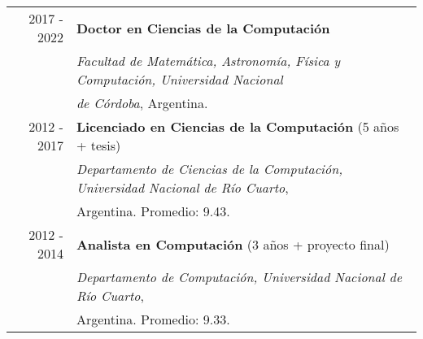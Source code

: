 \documentclass[a4paper,10pt]{article} %
\begin{document}
\begin{tabular}{rl}
\\
\textsc{2017 - 2022}	& \textbf{Doctor en Ciencias de la Computación} \\
& \textit{Facultad de Matemática, Astronomía, Física y Computación, Universidad Nacional} \\ 
& \textit{de Córdoba}, Argentina. \\

\textsc{2012 - 2017}	& \textbf{Licenciado en Ciencias de la Computación} (5 años + tesis) \\
& \textit{Departamento de Ciencias de la Computación, Universidad Nacional de Río Cuarto}, \\
& Argentina. Promedio: 9.43. \\

\textsc{2012 - 2014}	& \textbf{Analista en Computación} (3 años + proyecto final) \\
& \textit{Departamento de Computación, Universidad Nacional de Río Cuarto}, \\ 
& Argentina. Promedio: 9.33. \\

\end{tabular}
\end{document}
